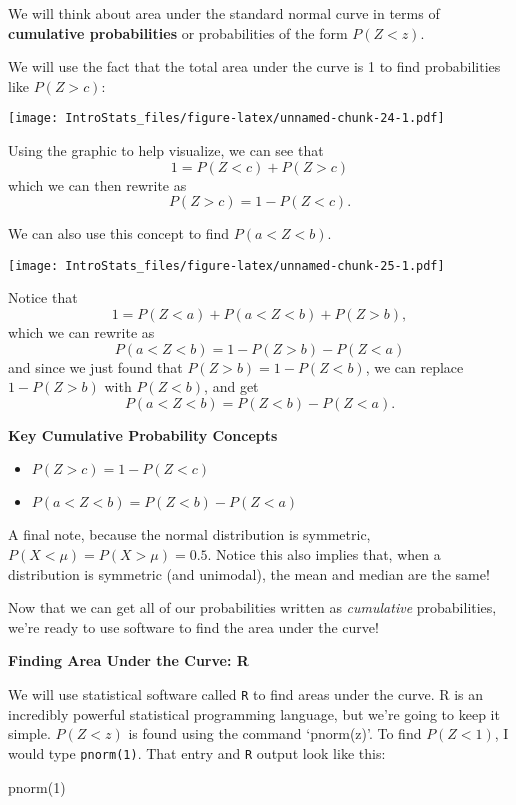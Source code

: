 \documentclass[
]{book}
\newenvironment{Shaded}{\begin{snugshade}}{\end{snugshade}}
\newcommand{\DecValTok}[1]{\textcolor[rgb]{0.00,0.00,0.81}{#1}}
\newcommand{\FunctionTok}[1]{\textcolor[rgb]{0.00,0.00,0.00}{#1}}
\newcommand{\NormalTok}[1]{#1}
\providecommand{\tightlist}{%
  \setlength{\itemsep}{0pt}\setlength{\parskip}{0pt}}
\begin{document}
We will think about area under the standard normal curve in terms of \textbf{cumulative probabilities} or probabilities of the form \(P(Z < z)\).

We will use the fact that the total area under the curve is 1 to find probabilities like \(P(Z > c)\):

\texttt{[image: IntroStats\_files/figure-latex/unnamed-chunk-24-1.pdf]}

Using the graphic to help visualize, we can see that \[1 = P(Z < c) + P(Z > c)\] which we can then rewrite as
\[P(Z > c) = 1-P(Z<c).\]

We can also use this concept to find \(P(a < Z < b)\).

\texttt{[image: IntroStats\_files/figure-latex/unnamed-chunk-25-1.pdf]}

Notice that \[1 = P(Z < a) + P(a < Z < b) + P(Z > b),\] which we can rewrite as \[P(a < Z < b) = 1 - P(Z > b) - P(Z < a)\] and since we just found that \(P(Z > b) = 1 - P(Z < b)\), we can replace \(1 - P(Z > b)\) with \(P(Z < b)\), and get \[P(a < Z < b) = P(Z < b) - P(Z < a).\]

\textbf{Key Cumulative Probability Concepts}

\begin{itemize}
\tightlist
\item
  \(P(Z > c) = 1 - P(Z < c)\)
\item
  \(P(a < Z < b) = P(Z < b) - P(Z < a)\)
\end{itemize}

A final note, because the normal distribution is symmetric, \(P(X < \mu) = P(X > \mu) = 0.5\). Notice this also implies that, when a distribution is symmetric (and unimodal), the mean and median are the same!

Now that we can get all of our probabilities written as \emph{cumulative} probabilities, we're ready to use software to find the area under the curve!

\textbf{Finding Area Under the Curve: R}

We will use statistical software called \texttt{R} to find areas under the curve. R is an incredibly powerful statistical programming language, but we're going to keep it simple. \(P(Z < z)\) is found using the command `pnorm(z)'. To find \(P(Z<1)\), I would type \texttt{pnorm(1)}. That entry and \texttt{R} output look like this:

\begin{Shaded}
\begin{Highlighting}[]
\FunctionTok{pnorm}\NormalTok{(}\DecValTok{1}\NormalTok{)}
\end{Highlighting}
\end{Shaded}
\end{document}
